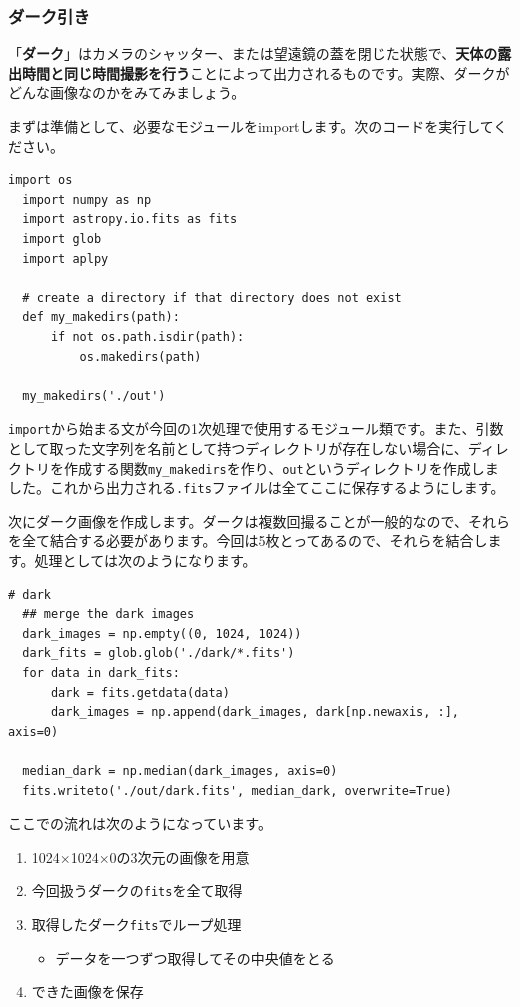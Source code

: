 \subsubsection{ダーク引き}
「\textbf{ダーク}」はカメラのシャッター、または望遠鏡の蓋を閉じた状態で、\textbf{天体の露出時間と同じ時間撮影を行う}ことによって出力されるものです。実際、ダークがどんな画像なのかをみてみましょう。\par
まずは準備として、必要なモジュールをimportします。次のコードを実行してください。
\begin{lstlisting}[caption=モジュールのimport, label=code:import]
  import os
  import numpy as np
  import astropy.io.fits as fits
  import glob
  import aplpy

  # create a directory if that directory does not exist
  def my_makedirs(path):
      if not os.path.isdir(path):
          os.makedirs(path)

  my_makedirs('./out')
\end{lstlisting}
\texttt{import}から始まる文が今回の1次処理で使用するモジュール類です。また、引数として取った文字列を名前として持つディレクトリが存在しない場合に、ディレクトリを作成する関数\texttt{my\_makedirs}を作り、\texttt{out}というディレクトリを作成しました。これから出力される\texttt{.fits}ファイルは全てここに保存するようにします。\par
次にダーク画像を作成します。ダークは複数回撮ることが一般的なので、それらを全て結合する必要があります。今回は5枚とってあるので、それらを結合します。処理としては次のようになります。
\begin{lstlisting}[caption=ダーク画像の作成, label=code:mk_dark]
  # dark
  ## merge the dark images
  dark_images = np.empty((0, 1024, 1024))
  dark_fits = glob.glob('./dark/*.fits')
  for data in dark_fits:
      dark = fits.getdata(data)
      dark_images = np.append(dark_images, dark[np.newaxis, :], axis=0)

  median_dark = np.median(dark_images, axis=0)
  fits.writeto('./out/dark.fits', median_dark, overwrite=True)
\end{lstlisting}
ここでの流れは次のようになっています。
\begin{enumerate}[(1)]
  \item 1024$\times$1024$\times$0の3次元の画像を用意
  \item 今回扱うダークの\texttt{fits}を全て取得
  \item 取得したダーク\texttt{fits}でループ処理
  \begin{itemize}
    \item データを一つずつ取得してその中央値をとる
  \end{itemize}
  \item できた画像を保存
\end{enumerate}

